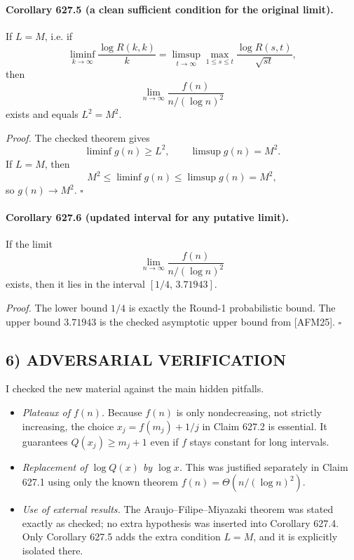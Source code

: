\paragraph{Corollary 627.5 (a clean sufficient condition for the original limit).}
If \(L=M\), i.e. if
\[
\liminf_{k\to\infty}\frac{\log R(k,k)}{k}
=
\limsup_{t\to\infty}\max_{1\le s\le t}\frac{\log R(s,t)}{\sqrt{st}},
\]
then
\[
\lim_{n\to\infty}\frac{f(n)}{n/(\log n)^2}
\]
exists and equals \(L^2=M^2\).

\emph{Proof.}
The checked theorem gives
\[
\liminf g(n)\ge L^2,\qquad \limsup g(n)=M^2.
\]
If \(L=M\), then
\[
M^2\le \liminf g(n)\le \limsup g(n)=M^2,
\]
so \(g(n)\to M^2\). \(\square\)

\paragraph{Corollary 627.6 (updated interval for any putative limit).}
If the limit
\[
\lim_{n\to\infty}\frac{f(n)}{n/(\log n)^2}
\]
exists, then it lies in the interval \([1/4,\,3.71943]\).

\emph{Proof.}
The lower bound \(1/4\) is exactly the Round-1 probabilistic bound.
The upper bound \(3.71943\) is the checked asymptotic upper bound from [AFM25]. \(\square\)

\subsection*{6) ADVERSARIAL VERIFICATION}

I checked the new material against the main hidden pitfalls.

\begin{itemize}
\item \emph{Plateaux of \(f(n)\).}  
Because \(f(n)\) is only nondecreasing, not strictly increasing, the choice
\(x_j=f(m_j)+1/j\) in Claim 627.2 is essential. It guarantees \(Q(x_j)\ge m_j+1\)
even if \(f\) stays constant for long intervals.

\item \emph{Replacement of \(\log Q(x)\) by \(\log x\).}  
This was justified separately in Claim 627.1 using only the known theorem \(f(n)=\Theta(n/(\log n)^2)\).

\item \emph{Use of external results.}  
The Araujo--Filipe--Miyazaki theorem was stated exactly as checked; no extra hypothesis was inserted into Corollary 627.4. Only Corollary 627.5 adds the extra condition \(L=M\), and it is explicitly isolated there.
\end{itemize}

